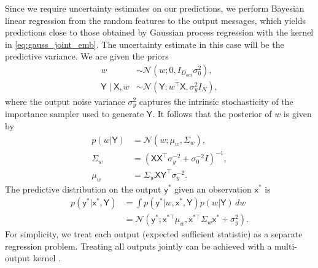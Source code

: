 \documentclass[english]{article}
\theoremstyle{plain}
\theoremstyle{plain}
\begin{document}
Since we require uncertainty estimates on our predictions,
we perform Bayesian linear regression from the random features to the output messages,
which yields predictions close to those obtained by Gaussian process regression
with the kernel in \eqref{eq:gauss_joint_emb}.
The uncertainty estimate in this case will be the predictive 
variance.
We are given the priors
\begin{align}
w & \sim\mathcal{N}\left(w;0,I_{D_\mathrm{out}}\sigma_{0}^{2}\right), \\
\mathsf{Y} \mid \mathsf{X},w & \sim\mathcal{N}\left(\mathsf{Y};w^{\top} \mathsf{X},\sigma_{y}^{2}I_{N}\right),
\end{align}
%
where the output noise variance $\sigma_{y}^{2}$ captures the intrinsic
stochasticity of the importance sampler used to generate $\mathsf{Y}$. It
follows that the posterior of $w$ is given by \citep{Bishop2006}
%
\begin{align}
p(w | \mathsf{Y}) & =\mathcal{N}(w;\mu_{w},\Sigma_{w}), \\
\Sigma_{w} & = \left( \mathsf{X} \mathsf{X}^{\top}\sigma_{y}^{-2}+\sigma_{0}^{-2}I \right)^{-1}, \\
\mu_{w} & =\Sigma_{w} \mathsf{X} \mathsf{Y}^{\top}\sigma_{y}^{-2}.
\end{align}
The predictive distribution on the output $\mathsf{y}^{*}$ given an 
observation $\mathsf{x}^{*}$ is
%
\begin{align}
p(\mathsf{y}^{*}| \mathsf{x}^{*}, \mathsf{Y}) & =\int  
 p(\mathsf{y}^{*}|w, \mathsf{x}^{*}, \mathsf{Y}) p(w|\mathsf{Y}) \, dw\\
 & =\mathcal{N}\left(\mathsf{y}^{*}; \mathsf{x}^{*\top}\mu_{w}, \mathsf{x}^{*\top}\Sigma_{w} \mathsf{x}^{*}+\sigma_{y}^{2}\right).
\end{align}
%
%
For simplicity, we treat each output (expected sufficient statistic) as a separate regression problem. 
Treating all outputs jointly can be achieved with a multi-output kernel \citep{Alvarez2011}.
\end{document}
